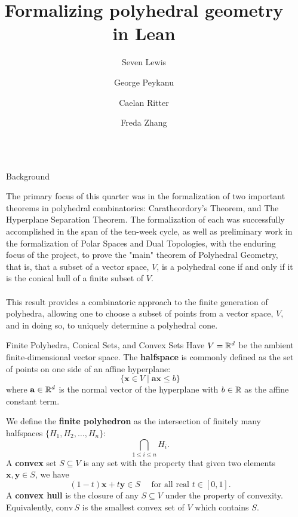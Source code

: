 \documentclass[final]{beamer}
\title{Formalizing polyhedral geometry in Lean}
\author{Seven Lewis \and George Peykanu \and Caelan Ritter \and Freda Zhang}
\institute[]{University of Washington}
\newlength{\sepwidth}
\newlength{\colwidth}
\newcommand{\separatorcolumn}{\begin{column}{\sepwidth}\end{column}}
\begin{document}
\begin{frame}[fragile]
    \begin{columns}[t]
        \separatorcolumn

        \begin{column}{\colwidth}

            \begin{block}{Background}
           
                The primary focus of this quarter was in the formalization of two important theorems in polyhedral combinatorics:
                Caratheordory's Theorem, and The Hyperplane Separation Theorem. The formalization of each was successfully accomplished in the
                span of the ten-week cycle, as well as preliminary work in the formalization of Polar Spaces and Dual Topologies, with the enduring
                focus of the project, to prove the "main" theorem of Polyhedral Geometry, that is, that a subset of a vector space, $V$, is a polyhedral cone
                if and only if it is the conical hull of a finite subset of $V$.
                \\\\This result provides a combinatoric approach to the finite generation of polyhedra, allowing one to choose a subset of points from a vector space,
                $V$, and in doing so, to uniquely determine a polyhedral cone.
                
            \end{block}

            \begin{block}{Finite Polyhedra, Conical Sets, and Convex Sets}
                Have $V = \mathbb{R}^d$ be the ambient finite-dimensional vector space. The \textbf{halfspace} is commonly defined as the set of points on one side of an affine hyperplane:
                $$ \{\mathbf{x} \in V \;|\; \mathbf{ax} \leq b\}$$
                where $\mathbf{a} \in \mathbb{R}^d$ is the normal vector of the hyperplane with $b \in \mathbb{R}$ as the affine constant term.

                We define the \textbf{finite polyhedron} as the intersection of finitely many halfspaces $\{H_1,H_2,\dots,H_n\}$:
                $$ \bigcap_{1 \leq i \leq n} H_i. $$
                A \textbf{convex} set $S \subseteq V$ is any set with the property that given two elements $\mathbf{x}, \mathbf{y} \in S$, we have
                $$ (1 - t)\mathbf{x} + t\mathbf{y} \in S \quad \text{ for all real } t \in [0,1].$$
                A \textbf{convex hull} is the closure of any $S \subseteq V$ under the property of convexity. Equivalently, $\text{conv}\,S$ is the smallest convex set of $V$ which contains $S$. 


\end{block}
\end{column}
\end{columns}
\end{frame}
\end{document}
